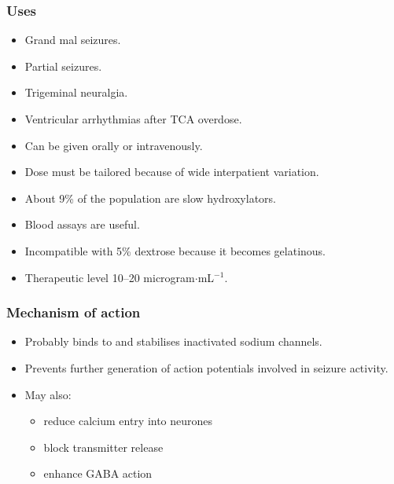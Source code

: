 \documentclass[11pt,a4paper]{article}
\begin{document}
\subsubsection{Uses}
\begin{itemize}
  \item Grand mal seizures.
  \item Partial seizures.
  \item Trigeminal neuralgia.
  \item Ventricular arrhythmias after TCA overdose.
  \item Can be given orally or intravenously.
  \item Dose must be tailored because of wide interpatient variation.
  \item About 9\% of the population are slow hydroxylators.
  \item Blood assays are useful.
  \item Incompatible with 5\% dextrose because it becomes gelatinous.
  \item Therapeutic level 10--20 microgram$\cdot$mL$^{-1}$.
\end{itemize}

\subsubsection{Mechanism of action}
\begin{itemize}
  \item Probably binds to and stabilises inactivated sodium channels.
  \item Prevents further generation of action potentials involved in seizure activity.
  \item May also:
  \begin{itemize}
    \item reduce calcium entry into neurones
    \item block transmitter release
    \item enhance GABA action
  \end{itemize}
\end{itemize}
\end{document}
